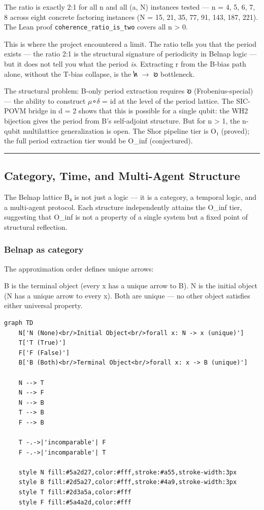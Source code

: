 \documentclass[12pt,a4paper]{article}
\begin{document}
The ratio is exactly 2:1 for all n and all (a, N) instances tested --- n = 4, 5, 6, 7, 8 across eight concrete factoring instances (N = 15, 21, 35, 77, 91, 143, 187, 221). The Lean proof \texttt{coherence\_ratio\_is\_two} covers all n \textgreater{} 0.

This is where the project encountered a limit. The ratio tells you that the period exists --- the ratio 2:1 is the structural signature of periodicity in Belnap logic --- but it does not tell you what the period \emph{is}. Extracting r from the B-bias path alone, without the T-bias collapse, is the 𐑿 $\rightarrow$ 𐑹 bottleneck.

The structural problem: B-only period extraction requires 𐑹 (Frobenius-special) --- the ability to construct $\mu$∘$\delta$ = id at the level of the period lattice. The SIC-POVM bridge in d = 2 shows that this is possible for a single qubit: the WH2 bijection gives the period from B's self-adjoint structure. But for n \textgreater{} 1, the n-qubit multilattice generalization is open. The Shor pipeline tier is O₁ (proved); the full period extraction tier would be O\_inf (conjectured).

\begin{center}
\rule{0.5\textwidth}{0.4pt}
\end{center}

\subsection{Category, Time, and Multi-Agent Structure}

The Belnap lattice B₄ is not just a logic --- it is a category, a temporal logic, and a multi-agent protocol. Each structure independently attains the O\_inf tier, suggesting that O\_inf is not a property of a single system but a fixed point of structural reflection.

\subsubsection{Belnap as category}

The approximation order defines unique arrows:

B is the terminal object (every x has a unique arrow to B). N is the initial object (N has a unique arrow to every x). Both are unique --- no other object satisfies either universal property.

\begin{lstlisting}[language=mermaid]
graph TD
    N['N (None)<br/>Initial Object<br/>forall x: N -> x (unique)']
    T['T (True)']
    F['F (False)']
    B['B (Both)<br/>Terminal Object<br/>forall x: x -> B (unique)']

    N --> T
    N --> F
    N --> B
    T --> B
    F --> B

    T -.->|'incomparable'| F
    F -.->|'incomparable'| T

    style N fill:#5a2d27,color:#fff,stroke:#a55,stroke-width:3px
    style B fill:#2d5a27,color:#fff,stroke:#4a9,stroke-width:3px
    style T fill:#2d3a5a,color:#fff
    style F fill:#5a4a2d,color:#fff
\end{lstlisting}
\end{document}
